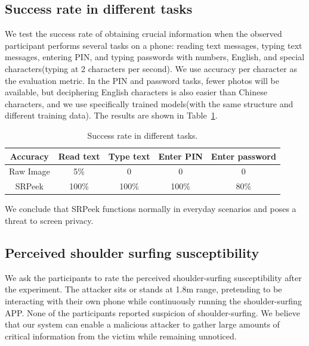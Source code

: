 \subsection{Success rate in different tasks}
We test the success rate of obtaining crucial information when the observed participant performs several tasks on a phone: reading text messages, typing text messages, entering PIN, and typing passwords with numbers, English, and special characters(typing at 2 characters per second). We use accuracy per character as the evaluation metric. In the PIN and password tasks, fewer photos will be available, but deciphering English characters is also easier than Chinese characters, and we use specifically trained models(with the same structure and different training data). The results are shown in Table~\ref{table-task}.

\begin{table}[!t]
\centering
\caption{Success rate in different tasks.}
\label{table-task}
\begin{tabular}{@{}ccccc@{}}
	\toprule
Accuracy & Read text & Type text & Enter PIN & Enter password\\ \midrule
Raw Image & 5\% & 0 & 0 & 0\\
SRPeek & 100\% & 100\% & 100\% & 80\%\\ \bottomrule
\end{tabular}

\end{table}

We conclude that \textsf{SRPeek} functions normally in everyday scenarios and poses a threat to screen privacy.

\subsection{Perceived shoulder surfing susceptibility}
We ask the participants to rate the perceived shoulder-surfing susceptibility after the experiment. The attacker sits or stands at 1.8m range, pretending to be interacting with their own phone while continuously running the shoulder-surfing APP. None of the participants reported suspicion of shoulder-surfing. We believe that our system can enable a malicious attacker to gather large amounts of critical information from the victim while remaining unnoticed.




